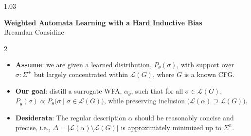 \documentclass[portrait,a0b,final,a4resizeable]{a0poster}
\begin{document}
\begin{poster}
  \vspace{1cm}

  \begin{center}
    \begin{pcolumn}{1.03}
      \begin{minipage}[c][9cm][c]{0.85\textwidth}
        \begin{center}
        {\Huge \textbf{Weighted Automata Learning with a Hard Inductive Bias}}\\[8mm]
        {\huge Breandan Considine}
        \end{center}
      \end{minipage}
    \end{pcolumn}
  \end{center}

  \vspace*{-0.5cm}
  \large
  \Large

  \begin{multicols}{2}


    \vspace*{-0.8cm}
    \null\hspace*{2.8cm}\begin{minipage}[c]{0.86\columnwidth}
          \renewcommand\labelitemi{$\vcenter{\hbox{\small\bullet}}$}
          \begin{itemize}
            \item \textbf{Assume}: we are given a learned distribution, $P_{\theta}(\sigma)$, with support over $\sigma: \Sigma^+$ but largely concentrated within $\mathcal{L}(G)$, where $G$ is a known CFG.
            \item \textbf{Our goal}: distill a surrogate WFA, $\alpha_{\hat\theta}$, such that for all $\sigma \in \mathcal{L}(G)$, $P_{\hat\theta}(\sigma) \propto P_{\theta}\big(\sigma \mid \sigma \in \mathcal{L}(G)\big)$, while preserving inclusion $\big(\mathcal{L}(\alpha)\supseteq \mathcal{L}(G)\big)$.
            \item \textbf{Desiderata}: The regular description $\alpha$ should be reasonably concise and precise, i.e., $\Delta = |\mathcal{L}(\alpha) \setminus \mathcal{L}(G)|$ is approximately minimized up to $\Sigma^n$.
          \end{itemize}
    \end{minipage}


\end{multicols}
\end{poster}
\end{document}
